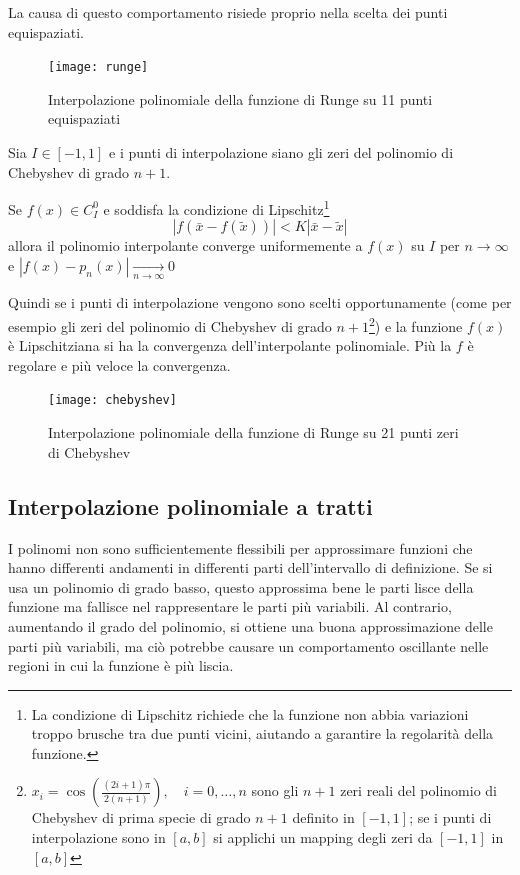 \documentclass{article}
\begin{document}
La causa di questo comportamento risiede proprio nella scelta dei punti
equispaziati.
\begin{figure}[ht]
    \centering
    \texttt{[image: runge]}
    \caption{Interpolazione polinomiale della funzione di Runge su 11 punti
    equispaziati}
\end{figure}
\begin{theorem}
    Sia $I\in[-1,1]$ e i punti di interpolazione siano gli zeri del polinomio
    di Chebyshev di grado $n+1$.

    Se $f(x)\in C_{I}^0$ e soddisfa la condizione di Lipschitz\footnote{
        La condizione di Lipschitz richiede che la funzione non abbia
        variazioni troppo brusche tra due punti vicini, aiutando a garantire
        la regolarità della funzione.
    }
    $$\left\lvert f(\bar{x}-f(\tilde{x}))\right\rvert< K \left\lvert
    \bar{x}-\tilde{x}\right\rvert$$
    allora il polinomio interpolante converge uniformemente a $f(x)$ su $I$
    per $n\to\infty$ e $\left\lvert
    f(x)-p_n(x)\right\rvert\underset{n\rightarrow\infty}{\to}0$
\end{theorem}
Quindi se i punti di interpolazione vengono sono scelti opportunamente (come per esempio
gli zeri del polinomio di Chebyshev di grado $n+1$\footnote{
    $x_i=\cos(\frac{(2i+1)\pi}{2(n+1)}),\quad i=0,\ldots,n$ sono gli $n+1$
    zeri reali del polinomio di Chebyshev di prima specie di grado $n+1$
    definito in $[-1,1]$; se i punti di interpolazione sono in $[a,b]$ si
    applichi un mapping degli zeri da $[-1,1]$ in $[a,b]$
}) e la funzione $f(x)$ è Lipschitziana si ha la convergenza dell'interpolante
polinomiale. Più la $f$ è regolare e più veloce la convergenza.
\begin{figure}[ht]
    \centering
    \texttt{[image: chebyshev]}
    \caption{Interpolazione polinomiale della funzione di Runge su 21 punti zeri
    di Chebyshev}
\end{figure}
\subsection{Interpolazione polinomiale a tratti}
I polinomi non sono sufficientemente flessibili per approssimare funzioni che
hanno differenti andamenti in differenti parti dell'intervallo di
definizione. Se si usa un polinomio di grado basso, questo 
approssima bene le parti lisce della funzione ma fallisce nel rappresentare
le parti più variabili. Al contrario, aumentando il grado del polinomio, si
ottiene una buona approssimazione delle parti più variabili, ma ciò 
potrebbe causare un comportamento oscillante nelle regioni in cui la funzione
è più liscia.
\end{document}

